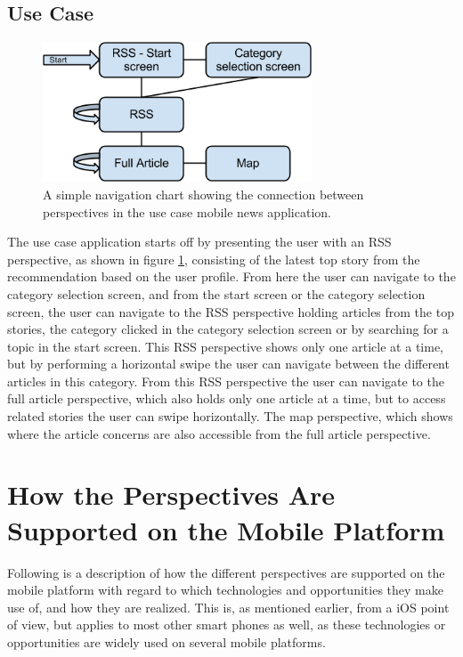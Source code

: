\subsection{Use Case}

\begin{figure}[!htbp]
\centering
\includegraphics[width=80mm]{GFX/statecharts/UseCase.png}
\caption{A simple navigation chart showing the connection between perspectives in the use case mobile news application.}
\label{state_chart_usecase}
\end{figure}

The use case application starts off by presenting the user with an RSS perspective, as shown in figure \ref{state_chart_usecase}, consisting of the latest top story from the recommendation based on the user profile. From here the user can navigate to the category selection screen, and from the start screen or the category selection screen, the user can navigate to the RSS perspective holding articles from the top stories, the category clicked in the category selection screen or by searching for a topic in the start screen. This RSS perspective shows only one article at a time, but by performing a horizontal swipe the user can navigate between the different articles in this category. From this RSS perspective the user can navigate to the full article perspective, which also holds only one article at a time, but to access related stories the user can swipe horizontally. The map perspective, which shows where the article concerns are also accessible from the full article perspective.

\section{How the Perspectives Are Supported on the Mobile Platform}

Following is a description of how the different perspectives are supported on the mobile platform with regard to which technologies and opportunities they make use of, and how they are realized. This is, as mentioned earlier, from a iOS point of view, but applies to most other smart phones as well, as these technologies or opportunities are widely used on several mobile platforms.

